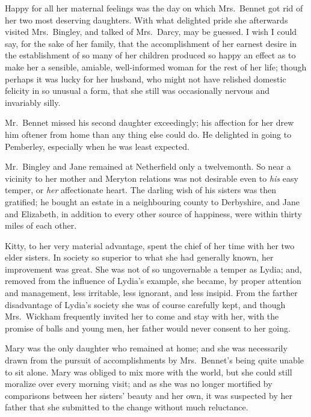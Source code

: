 \documentclass[12pt,english,oneside]{book}
\begin{document}

Happy for all her maternal feelings was the day on which Mrs.\ Bennet
got rid of her two most deserving daughters. With what delighted pride
she afterwards visited Mrs.\ Bingley, and talked of Mrs.\ Darcy,
may be guessed. I wish I could say, for the sake of her family, that
the accomplishment of her earnest desire in the establishment of so
many of her children produced so happy an effect as to make her a
sensible, amiable, well-informed woman for the rest of her life; though
perhaps it was lucky for her husband, who might not have relished
domestic felicity in so unusual a form, that she still was occasionally
nervous and invariably silly.

Mr.\ Bennet missed his second daughter exceedingly; his affection
for her drew him oftener from home than any thing else could do. He
delighted in going to Pemberley, especially when he was least expected.

Mr.\ Bingley and Jane remained at Netherfield only a twelvemonth.
So near a vicinity to her mother and Meryton relations was not desirable
even to \textit{his} easy temper, or \textit{her} affectionate heart.
The darling wish of his sisters was then gratified; he bought an estate
in a neighbouring county to Derbyshire, and Jane and Elizabeth, in
addition to every other source of happiness, were within thirty miles
of each other.

Kitty, to her very material advantage, spent the chief of her time
with her two elder sisters. In society so superior to what she had
generally known, her improvement was great. She was not of so ungovernable
a temper as Lydia; and, removed from the influence of Lydia's example,
she became, by proper attention and management, less irritable, less
ignorant, and less insipid. From the farther disadvantage of Lydia's
society she was of course carefully kept, and though Mrs.\ Wickham
frequently invited her to come and stay with her, with the promise
of balls and young men, her father would never consent to her going.

Mary was the only daughter who remained at home; and she was necessarily
drawn from the pursuit of accomplishments by Mrs.\ Bennet's being
quite unable to sit alone. Mary was obliged to mix more with the world,
but she could still moralize over every morning visit; and as she
was no longer mortified by comparisons between her sisters' beauty
and her own, it was suspected by her father that she submitted to
the change without much reluctance.
\end{document}
